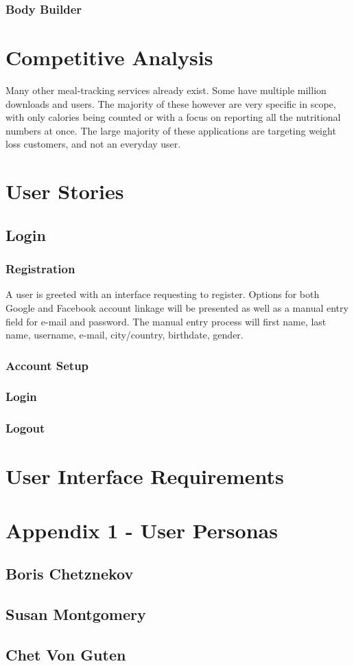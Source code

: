 \documentclass[a4paper,12pt]{article}
\begin{document}
\subsubsection*{Body Builder}
\section*{Competitive Analysis}
Many other meal-tracking services already exist.  Some have multiple million downloads and users.  The majority of these however are very specific in scope, with only calories being counted or with a focus on reporting all the nutritional numbers at once.  The large majority of these applications are targeting weight loss customers, and not an everyday user.
\section*{User Stories}
\subsection{Login}
\subsubsection{Registration}
A user is greeted with an interface requesting to register.  Options for both Google and Facebook account linkage will be presented as well as a manual entry field for e-mail and password.  The manual entry process will first name, last name, username, e-mail, city/country, birthdate, gender.
\subsubsection{Account Setup}

\subsubsection{Login}

\subsubsection{Logout}

\section*{User Interface Requirements}

\newpage 
\section*{Appendix 1 - User Personas}
\subsection*{Boris Chetznekov}
\subsection*{Susan Montgomery}
\subsection*{Chet Von Guten}
\end{document}
